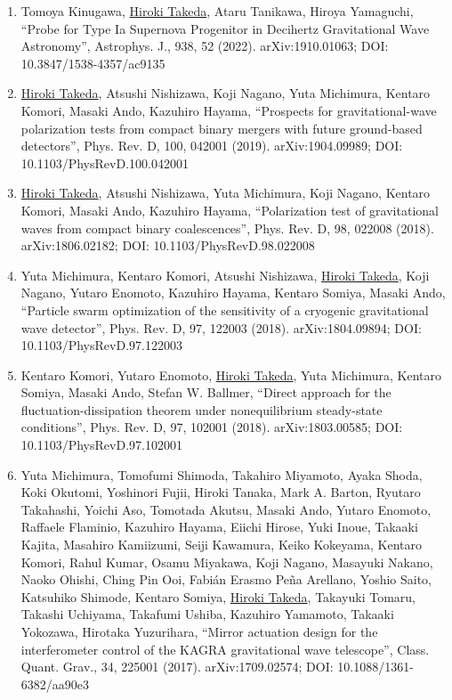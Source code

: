\documentclass[uplatex, 11pt]{jsarticle}
\begin{document}
\begin{enumerate}
\item Tomoya Kinugawa, \uline{Hiroki Takeda}, Ataru Tanikawa, Hiroya Yamaguchi, “Probe for Type Ia Supernova Progenitor in Decihertz Gravitational Wave Astronomy”, Astrophys. J., 938, 52 (2022). arXiv:1910.01063; DOI: 10.3847/1538-4357/ac9135
\item \uline{Hiroki Takeda}, Atsushi Nishizawa, Koji Nagano, Yuta Michimura, Kentaro Komori, Masaki Ando, Kazuhiro Hayama, “Prospects for gravitational-wave polarization tests from compact binary mergers with future ground-based detectors”, Phys. Rev. D, 100, 042001 (2019). arXiv:1904.09989; DOI: 10.1103/PhysRevD.100.042001
\item \uline{Hiroki Takeda}, Atsushi Nishizawa, Yuta Michimura, Koji Nagano, Kentaro Komori, Masaki Ando, Kazuhiro Hayama, “Polarization test of gravitational waves from compact binary coalescences”, Phys. Rev. D, 98, 022008 (2018). arXiv:1806.02182; DOI: 10.1103/PhysRevD.98.022008
\item Yuta Michimura, Kentaro Komori, Atsushi Nishizawa, \uline{Hiroki Takeda}, Koji Nagano, Yutaro Enomoto, Kazuhiro Hayama, Kentaro Somiya, Masaki Ando, “Particle swarm optimization of the sensitivity of a cryogenic gravitational wave detector”, Phys. Rev. D, 97, 122003 (2018). arXiv:1804.09894; DOI: 10.1103/PhysRevD.97.122003
\item Kentaro Komori, Yutaro Enomoto, \uline{Hiroki Takeda}, Yuta Michimura, Kentaro Somiya, Masaki Ando, Stefan W. Ballmer, “Direct approach for the fluctuation-dissipation theorem under nonequilibrium steady-state conditions”, Phys. Rev. D, 97, 102001 (2018). arXiv:1803.00585; DOI: 10.1103/PhysRevD.97.102001
\item Yuta Michimura, Tomofumi Shimoda, Takahiro Miyamoto, Ayaka Shoda, Koki Okutomi, Yoshinori Fujii, Hiroki Tanaka, Mark A. Barton, Ryutaro Takahashi, Yoichi Aso, Tomotada Akutsu, Masaki Ando, Yutaro Enomoto, Raffaele Flaminio, Kazuhiro Hayama, Eiichi Hirose, Yuki Inoue, Takaaki Kajita, Masahiro Kamiizumi, Seiji Kawamura, Keiko Kokeyama, Kentaro Komori, Rahul Kumar, Osamu Miyakawa, Koji Nagano, Masayuki Nakano, Naoko Ohishi, Ching Pin Ooi, Fabián Erasmo Peña Arellano, Yoshio Saito, Katsuhiko Shimode, Kentaro Somiya, \uline{Hiroki Takeda}, Takayuki Tomaru, Takashi Uchiyama, Takafumi Ushiba, Kazuhiro Yamamoto, Takaaki Yokozawa, Hirotaka Yuzurihara, “Mirror actuation design for the interferometer control of the KAGRA gravitational wave telescope”, Class. Quant. Grav., 34, 225001 (2017). arXiv:1709.02574; DOI: 10.1088/1361-6382/aa90e3
\end{enumerate}
\end{document}
